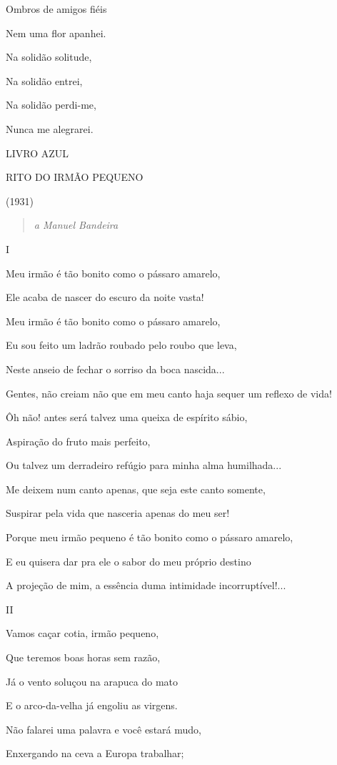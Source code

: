 Ombros de amigos fiéis

Nem uma flor apanhei.

Na solidão solitude,

Na solidão entrei,

Na solidão perdi-me,

Nunca me alegrarei.

\textsc{LIVRO AZUL}

\textsc{RITO DO IRMÃO PEQUENO}

(1931)

\begin{quote}
\emph{a Manuel Bandeira}
\end{quote}

I

Meu irmão é tão bonito como o pássaro amarelo,

Ele acaba de nascer do escuro da noite vasta!

Meu irmão é tão bonito como o pássaro amarelo,

Eu sou feito um ladrão roubado pelo roubo que leva,

Neste anseio de fechar o sorriso da boca nascida...

Gentes, não creiam não que em meu canto haja sequer um reflexo de vida!

Ôh não! antes será talvez uma queixa de espírito sábio,

Aspiração do fruto mais perfeito,

Ou talvez um derradeiro refúgio para minha alma humilhada...

Me deixem num canto apenas, que seja este canto somente,

Suspirar pela vida que nasceria apenas do meu ser!

Porque meu irmão pequeno é tão bonito como o pássaro amarelo,

E eu quisera dar pra ele o sabor do meu próprio destino

A projeção de mim, a essência duma intimidade incorruptível!...

II

Vamos caçar cotia, irmão pequeno,

Que teremos boas horas sem razão,

Já o vento soluçou na arapuca do mato

E o arco-da-velha já engoliu as virgens.

Não falarei uma palavra e você estará mudo,

Enxergando na ceva a Europa trabalhar;

